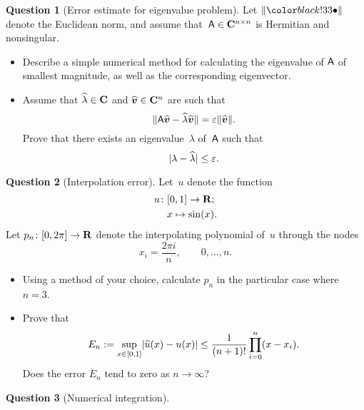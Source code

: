 \documentclass[11pt]{article}
\theoremstyle{definition}
\newtheorem{question}{Question}
\begin{document}
\newpage
\begin{question}
    [Error estimate for eigenvalue problem]
    Let $\norm{\placeholder}$ denote the Euclidean norm,
    and assume that~$\mathsf A \in \mathbf C^{n \times n}$ is Hermitian and nonsingular.

    \begin{itemize}
        \item
            Describe a simple numerical method for calculating the eigenvalue of $\mathsf A$ of smallest magnitude,
            as well as the corresponding eigenvector.


        \item
            Assume that $\widehat \lambda \in \mathbf C$ and $\widehat{\mathbf{\boldsymbol{v}}} \in \mathbf C^n$ are such that
            \[
                \lVert\mathsf A \widehat{\mathbf{\boldsymbol{v}}} - \widehat{\lambda} \widehat{\mathbf{\boldsymbol{v}}}\rVert = \varepsilon \lVert\widehat {\mathbf{\boldsymbol{v}}}\rVert.
            \]
            Prove that there exists an eigenvalue~$\lambda$ of~$\mathsf A$ such that
            \[
                \lvert\lambda - \widehat \lambda\rvert \leq \varepsilon.
            \]
    \end{itemize}

\end{question}

\newpage
\begin{question}
    [Interpolation error]
    Let~$u$ denote the function
    \begin{align*}
        u\colon
        &[0, 1] \to \mathbf R; \\
        &x \mapsto \sin(x).
    \end{align*}
    Let $p_n \colon [0, 2 \pi] \to \mathbf R$ denote the interpolating polynomial of~$u$ through the nodes
    \[
        x_i = \frac{2 \pi i}{n}, \qquad 0, \dotsc, n.
    \]
    \begin{itemize}
        \item
            Using a method of your choice,
            calculate $p_n$ in the particular case where $n = 3$.
        \item
            Prove that
            \[
                E_n := \sup_{x \in [0, 1]} \lvert\widehat u(x) - u(x)\rvert
                \leq \frac{1}{(n+1)!} \prod_{i=0}^{n} (x - x_i).
            \]
            Does the error $E_n$ tend to zero as $n \to \infty$?
    \end{itemize}
\end{question}

\newpage
\begin{question}
    [Numerical integration]
\end{question}
\end{document}

